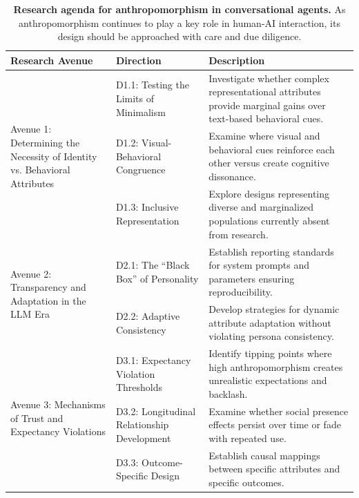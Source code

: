 \documentclass[manuscript,anonymous,sigconf]{acmart}
\begin{document}
\begin{table}[htbp]
\centering
\caption{\textbf{Research agenda for anthropomorphism in conversational agents.} As anthropomorphism continues to play a key role in human-AI interaction, its design should be approached with care and due diligence.}
\label{tab:research_agenda}
\begin{tabular}{p{} p{} p{}}
\toprule
\textbf{Research Avenue} & \textbf{Direction} & \textbf{Description} \\
\midrule
\multirow{3}{*}{\parbox{0.22\textwidth}{Avenue 1: Determining the Necessity of Identity vs. Behavioral Attributes}} 
& D1.1: Testing the Limits of Minimalism & Investigate whether complex representational attributes provide marginal gains over text-based behavioral cues. \\
\cmidrule(l){2-3}
& D1.2: Visual-Behavioral Congruence & Examine where visual and behavioral cues reinforce each other versus create cognitive dissonance. \\
\cmidrule(l){2-3}
& D1.3: Inclusive Representation & Explore designs representing diverse and marginalized populations currently absent from research. \\
\midrule
\multirow{2}{*}{\parbox{0.22\textwidth}{Avenue 2: Transparency and Adaptation in the LLM Era}} 
& D2.1: The ``Black Box'' of Personality & Establish reporting standards for system prompts and parameters ensuring reproducibility. \\
\cmidrule(l){2-3}
& D2.2: Adaptive Consistency & Develop strategies for dynamic attribute adaptation without violating persona consistency. \\
\midrule
\multirow{3}{*}{\parbox{0.22\textwidth}{Avenue 3: Mechanisms of Trust and Expectancy Violations}} 
& D3.1: Expectancy Violation Thresholds & Identify tipping points where high anthropomorphism creates unrealistic expectations and backlash. \\
\cmidrule(l){2-3}
& D3.2: Longitudinal Relationship Development & Examine whether social presence effects persist over time or fade with repeated use. \\
\cmidrule(l){2-3}
& D3.3: Outcome-Specific Design & Establish causal mappings between specific attributes and specific outcomes. \\
\bottomrule
\end{tabular}
\end{table}
\end{document}
